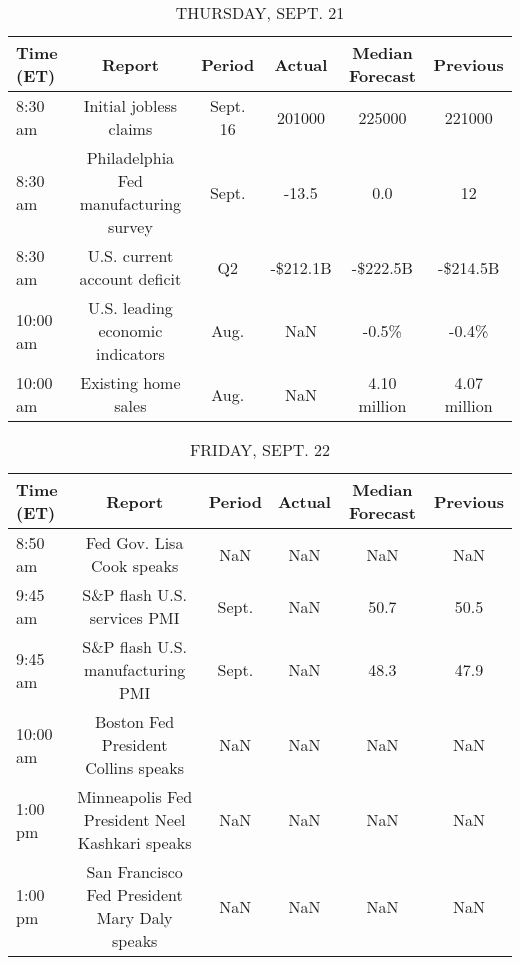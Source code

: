 \documentclass{article}%
\begin{document}
%


\begin{table}[htbp]%
\caption{THURSDAY, SEPT. 21}%
\centering%
\begin{adjustbox}{width=1\textwidth}%
\begin{tabular}{lccccc}
\toprule
Time (ET) &                                Report &   Period &   Actual & Median Forecast &     Previous \\
\midrule
  8:30 am &                Initial jobless claims & Sept. 16 &   201000 &          225000 &       221000 \\
  8:30 am & Philadelphia Fed manufacturing survey &    Sept. &    -13.5 &             0.0 &           12 \\
  8:30 am &          U.S. current account deficit &       Q2 & -\$212.1B &        -\$222.5B &     -\$214.5B \\
 10:00 am &      U.S. leading economic indicators &     Aug. &      NaN &           -0.5\% &        -0.4\% \\
 10:00 am &                   Existing home sales &     Aug. &      NaN &    4.10 million & 4.07 million \\
\bottomrule
\end{tabular}
%
\end{adjustbox}%
\end{table}

%


\begin{table}[htbp]%
\caption{FRIDAY, SEPT. 22}%
\centering%
\begin{adjustbox}{width=1\textwidth}%
\begin{tabular}{lccccc}
\toprule
Time (ET) &                                         Report & Period & Actual & Median Forecast & Previous \\
\midrule
  8:50 am &                      Fed Gov. Lisa Cook speaks &    NaN &    NaN &             NaN &      NaN \\
  9:45 am &                    S\&P flash U.S. services PMI &  Sept. &    NaN &            50.7 &     50.5 \\
  9:45 am &               S\&P flash U.S. manufacturing PMI &  Sept. &    NaN &            48.3 &     47.9 \\
 10:00 am &            Boston Fed President Collins speaks &    NaN &    NaN &             NaN &      NaN \\
  1:00 pm & Minneapolis Fed President Neel Kashkari speaks &    NaN &    NaN &             NaN &      NaN \\
  1:00 pm &   San Francisco Fed President Mary Daly speaks &    NaN &    NaN &             NaN &      NaN \\
\bottomrule
\end{tabular}
%
\end{adjustbox}%
\end{table}
\end{document}
